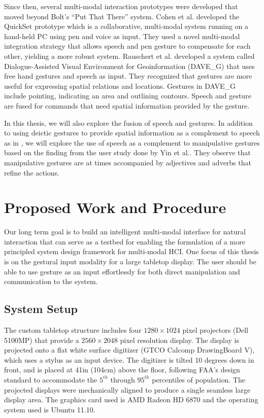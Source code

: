 Since then, several multi-modal interaction prototypes were 
developed that moved beyond Bolt's ``Put That There'' system. Cohen et al. 
\cite{Cohen97} developed the QuickSet prototype which is a collaborative, 
multi-modal system running on a hand-held PC using pen and voice as input. They 
used a novel multi-modal integration strategy that allows speech and pen gesture 
to compensate for each other, yielding a more robust system. Rauschert et al. 
\cite{Rauschert02} developed a system called Dialogue-Assisted Visual 
Environment for Geoinformation (DAVE\_G) that uses free hand gestures and speech
as input. They recognized that gestures are more useful for expressing spatial 
relations and locations. Gestures in DAVE\_G include pointing, indicating an 
area and outlining contours. Speech and gesture are fused for commands that need
spatial information provided by the gesture. 

In this thesis, we will also explore the fusion of speech and gestures. In
addition to using deictic gestures to provide spatial information as a
complement to speech as in \cite{Rauschert02}, we will explore the use of speech as a
complement to manipulative gestures based on the finding from the user study
done by Yin et al.\cite{yin10}. They observe that manipulative gestures are at times
accompanied by adjectives and adverbs that refine the actions.

\section{Proposed Work and Procedure}
Our long term goal is to build an intelligent multi-modal interface for natural
interaction that can serve as a testbed for enabling the formulation of a more
principled system design framework for multi-modal HCI. One focus of this thesis
is on the gestural input modality for a large tabletop display. The user should
be able to use gesture as an input effortlessly for both direct manipulation and communication to the system.

\subsection{System Setup}
The custom tabletop structure includes four $1280\times1024$ pixel projectors 
(Dell 5100MP) that provide a $2560\times2048$ pixel resolution display. The
display is projected onto a flat white surface digitizer (GTCO Calcomp DrawingBoard V), 
which uses a stylus as an input device. The digitizer is tilted 10 degrees down 
in front, and is placed at 41in (104cm) above the floor, following FAA's design 
standard to accommodate the $5^{th}$ through $95^{th}$ percentiles of 
population. The projected displays were mechanically aligned to produce a single 
seamless large display area. The graphics card used is AMD
Radeon HD 6870 and the operating system used is Ubuntu 11.10.

